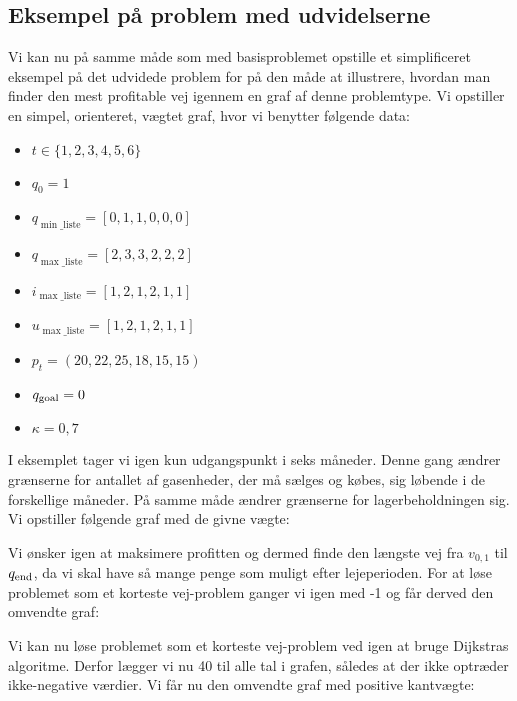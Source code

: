 \subsection{Eksempel på problem med udvidelserne} \label{kap:grafen_for_udvidet}
Vi kan nu på samme måde som med basisproblemet opstille et simplificeret eksempel på det udvidede problem for på den måde at illustrere, hvordan man finder den mest profitable vej igennem en graf af denne problemtype. Vi opstiller en simpel, orienteret, vægtet graf, hvor vi benytter følgende data:

\begin{itemize}
  \item $t \in \{1,2,3,4,5,6\}$
  \item $q_{0}=1$
  \item $q_{\min \_ \textrm{liste}}=[0,1,1,0,0,0]$
  \item $q_{\max \_ \textrm{liste}}=[2,3,3,2,2,2]$
  \item $i_{\max \_ \textrm{liste}}=[1,2,1,2,1,1]$
  \item $u_{\max \_ \textrm{liste}}=[1,2,1,2,1,1]$
  \item $p_{t}=(20,22,25,18,15,15)$
  \item $q_{\textrm{goal}}=0$
  \item $\kappa=0,7$
\end{itemize}

I eksemplet tager vi igen kun udgangspunkt i seks måneder. Denne gang ændrer grænserne for antallet af gasenheder, der må sælges og købes, sig løbende i de forskellige måneder. På samme måde ændrer grænserne for lagerbeholdningen sig. Vi opstiller følgende graf med de givne vægte:



Vi ønsker igen at maksimere profitten og dermed finde den længste vej fra $v_{0,1}$ til $q_{\textrm{end}}$, da vi skal have så mange penge som muligt efter lejeperioden. For at løse problemet som et korteste vej-problem ganger vi igen med -1 og får derved den omvendte graf:



Vi kan nu løse problemet som et korteste vej-problem ved igen at bruge Dijkstras algoritme. Derfor lægger vi nu 40 til alle tal i grafen, således at der ikke optræder ikke-negative værdier. Vi får nu den omvendte graf med positive kantvægte:




